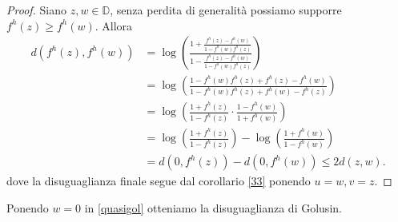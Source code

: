 \begin{proof}
  Siano $z, w \in \mathbb{D}$, senza perdita di generalità possiamo supporre $f^h(z) \ge f^h(w)$. Allora
  \begin{align*}
    d(f^h(z), f^h(w)) & =\log\left(\frac{1+\frac{f^h(z)-f^h(w)}{1-f^h(w)f^h(z)}}{1-\frac{f^h(z)-f^h(w)}{1-f^h(w)f^h(z)}}\right) \\
    & =\log\left(\frac{1-f^h(w)f^h(z)+f^h(z)-f^h(w)}{1-f^h(w)f^h(z)+f^h(w)-f^h(z)}\right) \\
    & =\log\left(\frac{1+f^h(z)}{1-f^h(z)}\cdot\frac{1-f^h(w)}{1+f^h(w)}\right) \\
    & =\log\left(\frac{1+f^h(z)}{1-f^h(z)}\right)-\log\left(\frac{1+f^h(w)}{1-f^h(w)}\right) \\
    & =d(0,f^h(z))-d(0,f^h(w)) \le 2d(z,w).
  \end{align*}
  dove la disuguaglianza finale segue dal corollario \ref{33} ponendo $u=w, v=z$.
\end{proof}

Ponendo $w=0$ in \eqref{quasigol} otteniamo la disuguaglianza di Golusin.
